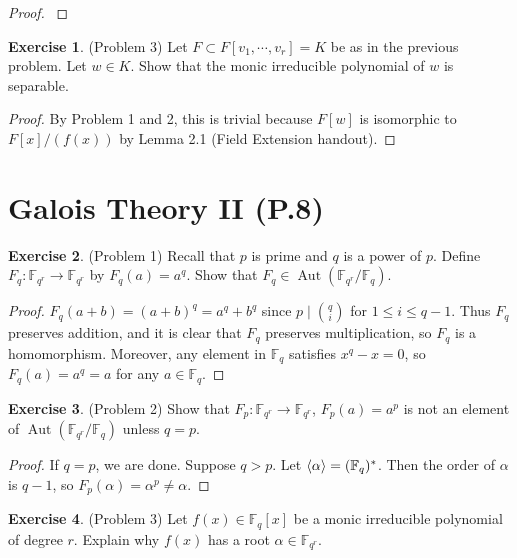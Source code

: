\documentclass[12pt, psamsfonts]{amsart}
\theoremstyle{definition}
\newtheorem*{exer}{Exercise}
\theoremstyle{remark}
\DeclareMathOperator{\Aut}{Aut}
\numberwithin{equation}{section}
\begin{document}
\begin{proof}
  $ $
\end{proof}

\begin{exer}{(Problem 3)}
  Let $F \subset F[v_1, \cdots, v_r] = K$ be as in the previous problem.
  Let $w \in K$.
  Show that the monic irreducible polynomial of $w$ is separable.
\end{exer}

\begin{proof}
  By Problem 1 and 2, this is trivial because $F[w]$ is isomorphic to $F[x]/(f(x))$ by Lemma 2.1 (Field Extension handout).
\end{proof}

\section{Galois Theory II (P.8)}

\begin{exer}{(Problem 1)}
  Recall that $p$ is prime and $q$ is a power of $p$.
  Define $F_q: \mathbb{F}_{q^r} \rightarrow \mathbb{F}_{q^r}$ by $F_q(a) = a^q$.
  Show that $F_q \in \Aut(\mathbb{F}_{q^r}/\mathbb{F}_q)$.
\end{exer}

\begin{proof}
  $F_q(a + b) = (a + b)^q = a^q + b^q$ since $p \mid \binom{q}{i}$ for $1 \leq i \leq q - 1$.
  Thus $F_q$ preserves addition, and it is clear that $F_q$ preserves multiplication, so $F_q$ is a homomorphism.
  Moreover, any element in $\mathbb{F}_q$ satisfies $x^q - x = 0$, so $F_q(a) = a^q = a$ for any $a \in \mathbb{F}_q$.
\end{proof}

\begin{exer}{(Problem 2)}
  Show that $F_p: \mathbb{F}_{q^r} \rightarrow \mathbb{F}_{q^r}$, $F_p(a) = a^p$ is not an element of $\Aut(\mathbb{F}_{q^r} / \mathbb{F}_q)$ unless $q = p$.
\end{exer}

\begin{proof}
  If $q = p$, we are done.
  Suppose $q > p$.
  Let $\ev{\alpha} = (\mathbb{F}_{q})^{*}$.
  Then the order of $\alpha$ is $q - 1$, so $F_p(\alpha) = \alpha^p \ne \alpha$.
\end{proof}

\begin{exer}{(Problem 3)}
  Let $f(x) \in \mathbb{F}_q[x]$ be a monic irreducible polynomial of degree $r$.
  Explain why $f(x)$ has a root $\alpha \in \mathbb{F}_{q^r}$.
\end{exer}
\end{document}
